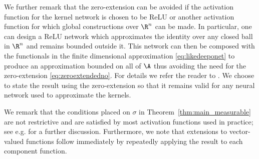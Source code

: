 We further remark that the zero-extension can be avoided if the activation function for the kernel network is chosen to be ReLU or another activation function for which global constructions over \(\R^n\) can be made. In particular, one can design a ReLU network which approximates the identity over any closed ball in \(\R^n\) and remains bounded outside it. This network can then be composed with the functionals in the finite dimensional approximation \eqref{eq:likedeeponet} to produce an approximation bounded on all of \(\A\) thus avoiding the need for the zero-extension \eqref{eq:zeroextendedno}. For details we refer the reader to \cite{lanthaler2021error}. We choose to state the result using the zero-extension so that it remains valid for any neural network used to approximate the kernels. 

We remark that the conditions placed on \(\sigma\) in Theorem~\ref{thm:main_measurable} are not restrictive and are satisfied by most activation functions used in practice; see e.g. \cite{lu2019deeponet} for a further discussion. Furthermore, we note that extensions to vector-valued functions follow immediately by repeatedly applying the result to each component function.


